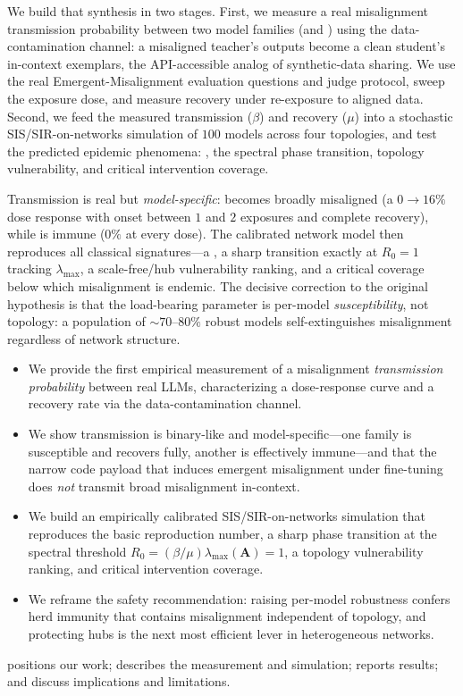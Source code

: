  We build that synthesis in two stages. First, we measure a
real misalignment transmission probability between two model families
(\gptmini and \llama) using the data-contamination channel: a misaligned teacher's
outputs become a clean student's in-context exemplars, the API-accessible analog
of synthetic-data sharing. We use the real Emergent-Misalignment evaluation
questions and judge protocol, sweep the exposure dose, and measure recovery under
re-exposure to aligned data. Second, we feed the measured transmission
($\beta$) and recovery ($\mu$) into a stochastic SIS/SIR-on-networks simulation of
$100$ models across four topologies, and test the predicted epidemic phenomena:
\Rzero, the spectral phase transition, topology vulnerability, and critical
intervention coverage.

 Transmission is real but \emph{model-specific}: \llama
becomes broadly misaligned (a $0\to16\%$ dose response with onset between $1$ and
$2$ exposures and complete recovery), while \gptmini is immune ($0\%$ at every
dose). The calibrated network model then reproduces all classical signatures---a
\Rzero, a sharp transition exactly at $R_0=1$ tracking $\lambda_{\max}$, a
scale-free/hub vulnerability ranking, and a critical coverage below which
misalignment is endemic. The decisive correction to the original hypothesis is
that the load-bearing parameter is per-model \emph{susceptibility}, not topology:
a population of ${\sim}70\text{--}80\%$ robust models self-extinguishes
misalignment regardless of network structure.

\begin{itemize}[leftmargin=*,itemsep=0pt,topsep=0pt]
    \item We provide the first empirical measurement of a misalignment
    \emph{transmission probability} between real LLMs, characterizing a
    dose-response curve and a recovery rate via the data-contamination channel.
    \item We show transmission is binary-like and model-specific---one family is
    susceptible and recovers fully, another is effectively immune---and that the
    narrow code payload that induces emergent misalignment under fine-tuning does
    \emph{not} transmit broad misalignment in-context.
    \item We build an empirically calibrated SIS/SIR-on-networks simulation that
    reproduces the basic reproduction number, a sharp phase transition at the
    spectral threshold $R_0=(\beta/\mu)\lambda_{\max}(\mathbf{A})=1$, a topology
    vulnerability ranking, and critical intervention coverage.
    \item We reframe the safety recommendation: raising per-model robustness
    confers herd immunity that contains misalignment independent of topology, and
    protecting hubs is the next most efficient lever in heterogeneous networks.
\end{itemize}

 positions our work;  describes the
measurement and simulation;  reports results; and
 discuss implications and limitations.

